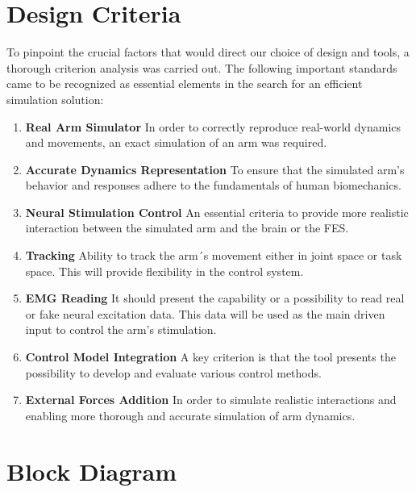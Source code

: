 \section{Design Criteria} 

To pinpoint the crucial factors that would direct our choice of design and tools, a thorough criterion analysis was carried out. The following important standards came to be recognized as essential elements in the search for an efficient simulation solution:

\begin{enumerate}
    \item \textbf{Real Arm Simulator} In order to correctly reproduce real-world dynamics and movements, an exact simulation of an arm was required.
    \item \textbf{Accurate Dynamics Representation} To ensure that the simulated arm's behavior and responses adhere to the fundamentals of human biomechanics.
    \item \textbf{Neural Stimulation Control} An essential criteria to provide more realistic interaction between the simulated arm and the brain or the FES.
    \item \textbf{Tracking} Ability to track the arm´s movement either in joint space or task space. This will provide flexibility in the control system.
    \item \textbf{EMG Reading} It should present the capability or a possibility to read real or fake neural excitation data. This data will be used as the main driven input to control the arm's stimulation.
    \item \textbf{Control Model Integration} A key criterion is that the tool presents the possibility to develop and evaluate various control methods.
    \item \textbf{External Forces Addition} In order to simulate realistic interactions and enabling more thorough and accurate simulation of arm dynamics.
    
\end{enumerate}



\section{Block Diagram}
 
